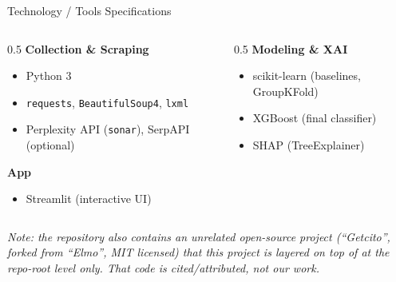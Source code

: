 \documentclass[aspectratio=169]{beamer}
\begin{document}
\begin{frame}{Technology / Tools Specifications}
  \begin{columns}[T]
    \begin{column}{0.5\textwidth}
      \textbf{Collection \& Scraping}
      \begin{itemize}
        \item Python 3
        \item \texttt{requests}, \texttt{BeautifulSoup4}, \texttt{lxml}
        \item Perplexity API (\texttt{sonar}), SerpAPI (optional)
      \end{itemize}
      \textbf{App}
      \begin{itemize}
        \item Streamlit (interactive UI)
      \end{itemize}
    \end{column}
    \begin{column}{0.5\textwidth}
      \textbf{Modeling \& XAI}
      \begin{itemize}
        \item scikit-learn (baselines, GroupKFold)
        \item XGBoost (final classifier)
        \item SHAP (TreeExplainer)
      \end{itemize}
    \end{column}
  \end{columns}
  \vspace{0.3cm}
  \small\textit{Note: the repository also contains an unrelated open-source project (``Getcito'', forked from ``Elmo'', MIT licensed) that this project is layered on top of at the repo-root level only. That code is cited/attributed, not our work.}
\end{frame}
\end{document}
